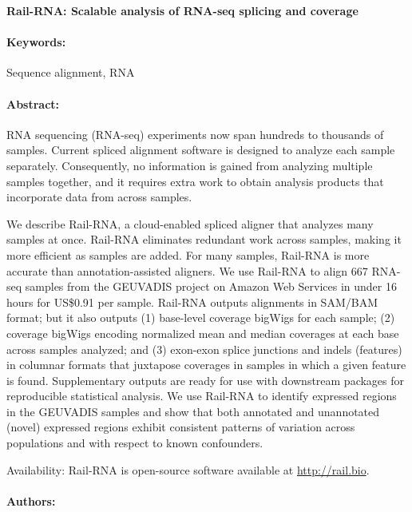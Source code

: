 \documentclass[11pt]{article}
\date{}
\author{}
\begin{document}
\noindent
\large {\bf Rail-RNA: Scalable analysis of RNA-seq splicing and coverage} 


\normalsize 


\noindent \paragraph{Keywords:} Sequence alignment, RNA

\noindent \paragraph{Abstract:} 

RNA sequencing (RNA-seq) experiments now span hundreds to thousands of samples.
Current spliced alignment software is designed to analyze each sample separately. Consequently, no
information is gained from analyzing multiple samples together, and it requires extra work to obtain analysis
products that incorporate data from across samples.

 We describe Rail-RNA, a cloud-enabled spliced aligner that analyzes many samples at once.
Rail-RNA eliminates redundant work across samples, making it more efficient as samples are added.
For many samples, Rail-RNA is more accurate than annotation-assisted aligners. We use Rail-RNA to
align 667 RNA-seq samples from the GEUVADIS project on Amazon Web Services in under 16 hours
for US\$0.91 per sample. Rail-RNA outputs alignments in SAM/BAM format; but it also outputs (1) base-level 
coverage bigWigs for each sample; (2) coverage bigWigs encoding normalized mean and median
coverages at each base across samples analyzed; and (3) exon-exon splice junctions and indels (features)
in columnar formats that juxtapose coverages in samples in which a given feature is found. Supplementary
outputs are ready for use with downstream packages for reproducible statistical analysis. We use Rail-RNA
to identify expressed regions in the GEUVADIS samples and show that both annotated and unannotated
(novel) expressed regions exhibit consistent patterns of variation across populations and with respect to
known confounders.

Availability: Rail-RNA is open-source software available at \url{http://rail.bio}.

\noindent \paragraph{Authors:} 

\noindent \paragraph{} 
\end{document}
